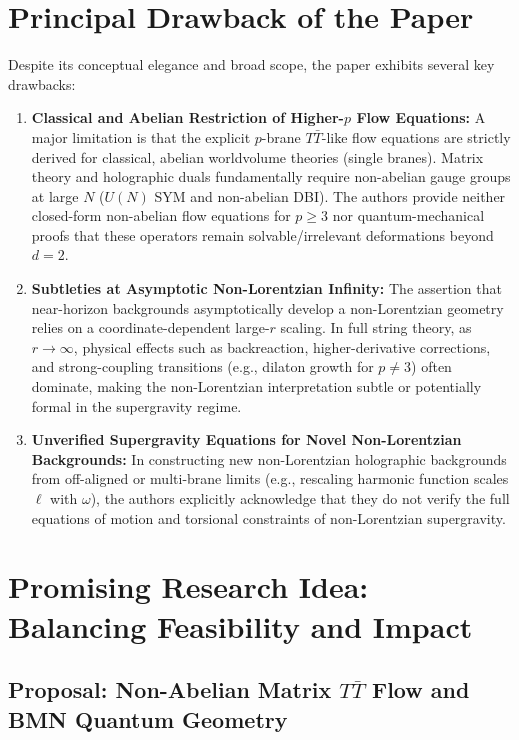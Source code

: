 \documentclass[11pt,a4paper]{article}
\begin{document}
\section{Principal Drawback of the Paper}

Despite its conceptual elegance and broad scope, the paper exhibits several key drawbacks:
\begin{enumerate}
    \item \textbf{Classical and Abelian Restriction of Higher-$p$ Flow Equations:} A major limitation is that the explicit $p$-brane $T\bar{T}$-like flow equations are strictly derived for classical, abelian worldvolume theories (single branes). Matrix theory and holographic duals fundamentally require non-abelian gauge groups at large $N$ ($U(N)$ SYM and non-abelian DBI). The authors provide neither closed-form non-abelian flow equations for $p \ge 3$ nor quantum-mechanical proofs that these operators remain solvable/irrelevant deformations beyond $d=2$.
    \item \textbf{Subtleties at Asymptotic Non-Lorentzian Infinity:} The assertion that near-horizon backgrounds asymptotically develop a non-Lorentzian geometry relies on a coordinate-dependent large-$r$ scaling. In full string theory, as $r \to \infty$, physical effects such as backreaction, higher-derivative corrections, and strong-coupling transitions (e.g., dilaton growth for $p \neq 3$) often dominate, making the non-Lorentzian interpretation subtle or potentially formal in the supergravity regime.
    \item \textbf{Unverified Supergravity Equations for Novel Non-Lorentzian Backgrounds:} In constructing new non-Lorentzian holographic backgrounds from off-aligned or multi-brane limits (e.g., rescaling harmonic function scales $\ell$ with $\omega$), the authors explicitly acknowledge that they do not verify the full equations of motion and torsional constraints of non-Lorentzian supergravity.
\end{enumerate}

\section{Promising Research Idea: Balancing Feasibility and Impact}

\subsection{Proposal: Non-Abelian Matrix \texorpdfstring{$T\bar{T}$}{TTbar} Flow and BMN Quantum Geometry}
\end{document}
